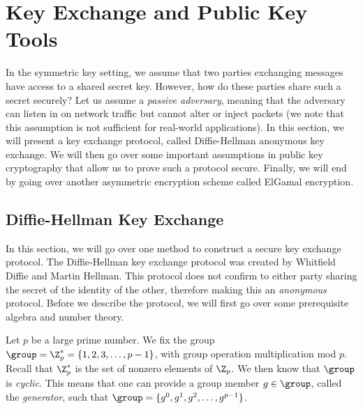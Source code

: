 \section{Key Exchange and Public Key Tools}
\label{sec:pke2}

In the symmetric key setting, we assume that two parties exchanging messages have access to a shared secret key. However, how do these parties share such a secret securely? Let us assume a \textit{passive adversary}, meaning that the adversary can listen in on network traffic but cannot alter or inject packets (we note that this assumption is not sufficient for real-world applications). In this section, we will present a key exchange protocol, called Diffie-Hellman anonymous key exchange. We will then go over some important assumptions in public key cryptography that allow us to prove such a protocol secure. Finally, we will end by going over another asymmetric encryption scheme called ElGamal encryption. 

\subsection{Diffie-Hellman Key Exchange}

In this section, we will go over one method to construct a secure key exchange protocol. The Diffie-Hellman key exchange protocol was created by Whitfield Diffie and Martin Hellman. This protocol does not confirm to either party sharing the secret of the identity of the other, therefore making this an \textit{anonymous} protocol. Before we describe the protocol, we will first go over some prerequisite algebra and number theory.

Let $p$ be a large prime number. We fix the group $\group = \Z_p^*=\{1,2,3,\ldots,p-1\}$, with group operation multiplication mod $p$. Recall that $\Z_p^*$ is the set of nonzero elements of $\Z_p$. We then know that $\group$ is \textit{cyclic}. This means that one can provide a group member $g \in \group$, called the \textit{generator}, such that $\group = \{g^0, g^1, g^2, \ldots, g^{p-1}\}$. 


